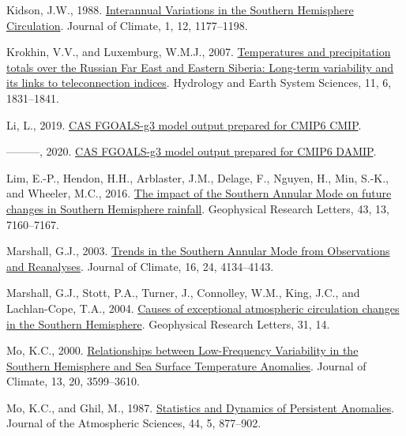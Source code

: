 \documentclass[12pt,oneside]{reedthesis}
\newlength{\cslhangindent}
\newenvironment{CSLReferences}[2] %
 {%
  \setlength{\parindent}{0pt}
  \ifodd #1 \everypar{\setlength{\hangindent}{\cslhangindent}}\ignorespaces\fi
  \ifnum #2 > 0
  \setlength{\parskip}{#2\baselineskip}
  \fi
 }%
 {}
\begin{document}
\begin{CSLReferences}{1}{0}
\leavevmode{}%
Kidson, J.W., 1988. \href{https://doi.org/10.1175/1520-0442(1988)001\%3C1177:IVITSH\%3E2.0.CO;2}{Interannual {Variations} in the {Southern Hemisphere Circulation}}. Journal of Climate, 1, 12, 1177--1198.

\leavevmode{}%
Krokhin, V.V., and Luxemburg, W.M.J., 2007. \href{https://doi.org/10.5194/hess-11-1831-2007}{Temperatures and precipitation totals over the {Russian Far East} and {Eastern Siberia}: Long-term variability and its links to teleconnection indices}. Hydrology and Earth System Sciences, 11, 6, 1831--1841.

\leavevmode{}%
Li, L., 2019. \href{https://doi.org/10.22033/ESGF/CMIP6.1783}{CAS FGOALS-g3 model output prepared for CMIP6 CMIP}.

\leavevmode{}%
---------, 2020. \href{https://doi.org/10.22033/ESGF/CMIP6.2048}{CAS FGOALS-g3 model output prepared for CMIP6 DAMIP}.

\leavevmode{}%
Lim, E.-P., Hendon, H.H., Arblaster, J.M., Delage, F., Nguyen, H., Min, S.-K., and Wheeler, M.C., 2016. \href{https://doi.org/10.1002/2016GL069453}{The impact of the {Southern Annular Mode} on future changes in {Southern Hemisphere} rainfall}. Geophysical Research Letters, 43, 13, 7160--7167.

\leavevmode{}%
Marshall, G.J., 2003. \href{https://doi.org/10.1175/1520-0442(2003)016\%3C4134:TITSAM\%3E2.0.CO;2}{Trends in the {Southern Annular Mode} from {Observations} and {Reanalyses}}. Journal of Climate, 16, 24, 4134--4143.

\leavevmode{}%
Marshall, G.J., Stott, P.A., Turner, J., Connolley, W.M., King, J.C., and Lachlan-Cope, T.A., 2004. \href{https://doi.org/10.1029/2004GL019952}{Causes of exceptional atmospheric circulation changes in the {Southern Hemisphere}}. Geophysical Research Letters, 31, 14.

\leavevmode{}%
Mo, K.C., 2000. \href{https://doi.org/10.1175/1520-0442(2000)013\%3C3599:RBLFVI\%3E2.0.CO;2}{Relationships between {Low-Frequency Variability} in the {Southern Hemisphere} and {Sea Surface Temperature Anomalies}}. Journal of Climate, 13, 20, 3599--3610.

\leavevmode{}%
Mo, K.C., and Ghil, M., 1987. \href{https://doi.org/10.1175/1520-0469(1987)044\%3C0877:SADOPA\%3E2.0.CO;2}{Statistics and {Dynamics} of {Persistent Anomalies}}. Journal of the Atmospheric Sciences, 44, 5, 877--902.


\end{CSLReferences}
\end{document}

